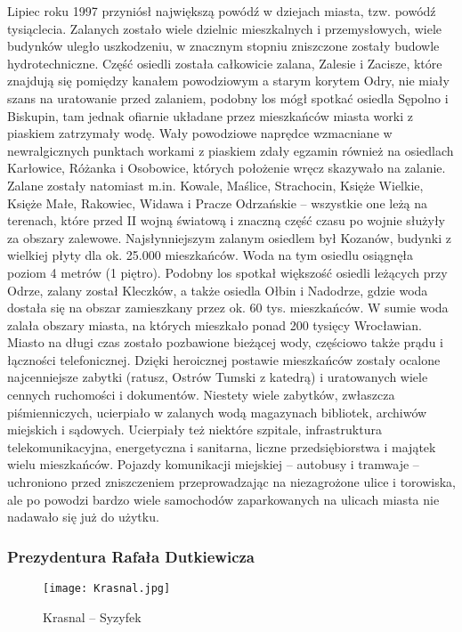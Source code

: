\documentclass{article}
\begin{document}
Lipiec roku 1997 przyniósł największą powódź w dziejach miasta, tzw. powódź tysiąclecia. Zalanych zostało wiele dzielnic mieszkalnych i przemysłowych, wiele budynków uległo uszkodzeniu, w znacznym stopniu zniszczone zostały budowle hydrotechniczne. Część osiedli została całkowicie zalana, Zalesie i Zacisze, które znajdują się pomiędzy kanałem powodziowym a starym korytem Odry, nie miały szans na uratowanie przed zalaniem, podobny los mógł spotkać osiedla Sępolno i Biskupin, tam jednak ofiarnie układane przez mieszkańców miasta worki z piaskiem zatrzymały wodę. Wały powodziowe naprędce wzmacniane w newralgicznych punktach workami z piaskiem zdały egzamin również na osiedlach Karłowice, Różanka i Osobowice, których położenie wręcz skazywało na zalanie. Zalane zostały natomiast m.in. Kowale, Maślice, Strachocin, Księże Wielkie, Księże Małe, Rakowiec, Widawa i Pracze Odrzańskie – wszystkie one leżą na terenach, które przed II wojną światową i znaczną część czasu po wojnie służyły za obszary zalewowe. Najsłynniejszym zalanym osiedlem był Kozanów, budynki z wielkiej płyty dla ok. 25.000 mieszkańców. Woda na tym osiedlu osiągnęła poziom 4 metrów (1 piętro). Podobny los spotkał większość osiedli leżących przy Odrze, zalany został Kleczków, a także osiedla Ołbin i Nadodrze, gdzie woda dostała się na obszar zamieszkany przez ok. 60 tys. mieszkańców. W sumie woda zalała obszary miasta, na których mieszkało ponad 200 tysięcy Wrocławian. Miasto na długi czas zostało pozbawione bieżącej wody, częściowo także prądu i łączności telefonicznej. Dzięki heroicznej postawie mieszkańców zostały ocalone najcenniejsze zabytki (ratusz, Ostrów Tumski z katedrą) i uratowanych wiele cennych ruchomości i dokumentów. Niestety wiele zabytków, zwłaszcza piśmienniczych, ucierpiało w zalanych wodą magazynach bibliotek, archiwów miejskich i sądowych. Ucierpiały też niektóre szpitale, infrastruktura telekomunikacyjna, energetyczna i sanitarna, liczne przedsiębiorstwa i majątek wielu mieszkańców. Pojazdy komunikacji miejskiej – autobusy i tramwaje – uchroniono przed zniszczeniem przeprowadzając na niezagrożone ulice i torowiska, ale po powodzi bardzo wiele samochodów zaparkowanych na ulicach miasta nie nadawało się już do użytku.

\subsubsection{Prezydentura Rafała Dutkiewicza}

\begin{wrapfigure}{r}{0.37\textwidth} 
\begin{center}
\vspace{-20pt}
\texttt{[image: Krasnal.jpg]}
\end{center}
\vspace{-20pt}
\caption{Krasnal – Syzyfek}
\vspace{-10pt}
\end{wrapfigure}
\end{document}
